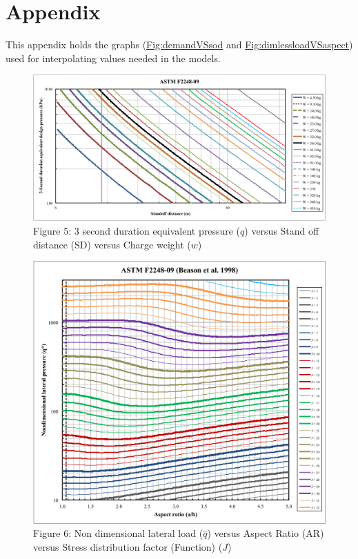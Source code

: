 \documentclass[12pt]{article}
\begin{document}
\section{Appendix}
\label{Sec:Appendix}
This appendix holds the graphs (\hyperref[Figure:demandVSsod]{Fig:demandVSsod} and \hyperref[Figure:dimlessloadVSaspect]{Fig:dimlessloadVSaspect}) used for interpolating values needed in the models.
\begin{figure}
\begin{center}
\includegraphics[width=\textwidth]{../../../datafiles/GlassBR/ASTM_F2248-09.png}
\caption{Figure 5: 3 second duration equivalent pressure ($q$) versus Stand off distance (SD) versus Charge weight ($w$)}
\label{Figure:demandVSsod}
\end{center}
\end{figure}
\begin{figure}
\begin{center}
\includegraphics[width=\textwidth]{../../../datafiles/GlassBR/ASTM_F2248-09_BeasonEtAl.png}
\caption{Figure 6: Non dimensional lateral load ($\hat{q}$) versus Aspect Ratio (AR) versus Stress distribution factor (Function) ($J$)}
\label{Figure:dimlessloadVSaspect}
\end{center}
\end{figure}
\end{document}
